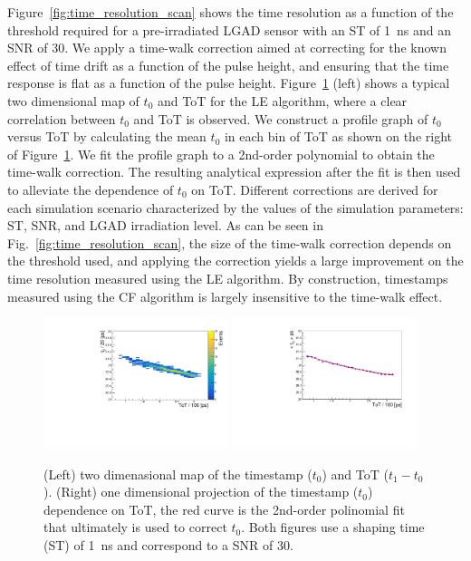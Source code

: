 \documentclass[preprint,1p]{elsarticle}
\begin{document}
Figure~\ref{fig:time_resolution_scan} shows the time resolution as a function
of the threshold required for a pre-irradiated LGAD sensor with an ST of 1~\si{ns} and an SNR of 30.
We apply a time-walk correction aimed at correcting for the known effect of time drift as a function
of the pulse height, and ensuring that the time response is flat as a function of the pulse height.
Figure~\ref{fig:ToT} (left) shows a typical two dimensional map of $t_{0}$ and ToT for the
LE algorithm, where a clear correlation between $t_{0}$ and ToT is observed.
We construct a profile graph of $t_{0}$ versus ToT by calculating the mean $t_{0}$ in
each bin of ToT as shown on the right of Figure~\ref{fig:ToT}. We fit the profile graph to a 2nd-order polynomial to
obtain the time-walk correction. The resulting analytical expression after the fit is then used to
alleviate the dependence of $t_{0}$ on ToT. Different corrections are derived for each simulation scenario
characterized by the values of the simulation parameters: ST, SNR, and LGAD irradiation level.
As can be seen in Fig.~\ref{fig:time_resolution_scan}, the size of the time-walk correction
depends on the threshold used, and applying the correction yields a large
improvement on the time resolution measured using the LE algorithm. By construction,
timestamps measured using the CF algorithm is largely insensitive to the time-walk effect.

\begin{figure}[htbp]
  \centering
  \includegraphics[width=0.48\textwidth]{figs/twoD_ToT_pre_rad_st_1ns_snr_30_le_tot_threshold_30mV_v2.pdf} \hfill
  \includegraphics[width=0.48\textwidth]{figs/oneD_ToT_pre_rad_st_1ns_snr_30_le_tot_threshold_30mV_v2.pdf}
  \caption{(Left) two dimenasional map of the timestamp ($t_{0}$) and ToT ($t_{1} - t_{0}$).
  (Right) one dimensional projection of the timestamp ($t_{0}$) dependence on ToT, the red curve is the 2nd-order polinomial fit that
  ultimately is used to correct $t_{0}$. Both figures use a shaping time (ST) of 1~\si{ns} and correspond to a SNR of 30.}
  \label{fig:ToT}
\end{figure}
\end{document}
